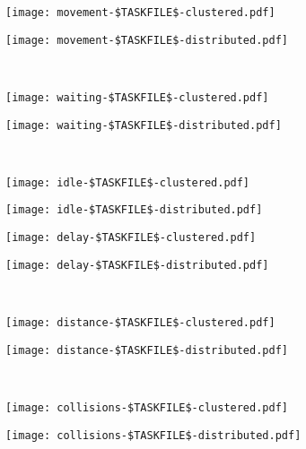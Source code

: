 \documentclass[11pt,a4paper]{article}
\begin{document}
\noindent
\begin{minipage}{0.5\textwidth}
\texttt{[image: movement-\$TASKFILE\$-clustered.pdf]}
\end{minipage}
\begin{minipage}{0.5\textwidth}
\texttt{[image: movement-\$TASKFILE\$-distributed.pdf]}
\end{minipage}
\\[0.2cm]

\noindent
\begin{minipage}{0.5\textwidth}
\texttt{[image: waiting-\$TASKFILE\$-clustered.pdf]}
\end{minipage}
\begin{minipage}{0.5\textwidth}
\texttt{[image: waiting-\$TASKFILE\$-distributed.pdf]}
\end{minipage}
\\[0.2cm]

\noindent
\begin{minipage}{0.5\textwidth}
\texttt{[image: idle-\$TASKFILE\$-clustered.pdf]}
\end{minipage}
\begin{minipage}{0.5\textwidth}
\texttt{[image: idle-\$TASKFILE\$-distributed.pdf]}
\end{minipage}

\noindent
\begin{minipage}{0.5\textwidth}
\texttt{[image: delay-\$TASKFILE\$-clustered.pdf]}
\end{minipage}
\begin{minipage}{0.5\textwidth}
\texttt{[image: delay-\$TASKFILE\$-distributed.pdf]}
\end{minipage}
\\[0.5cm]

\noindent
\begin{minipage}{0.5\textwidth}
\texttt{[image: distance-\$TASKFILE\$-clustered.pdf]}
\end{minipage}
\begin{minipage}{0.5\textwidth}
\texttt{[image: distance-\$TASKFILE\$-distributed.pdf]}
\end{minipage}
\\[0.5cm]

\noindent
\begin{minipage}{0.5\textwidth}
\texttt{[image: collisions-\$TASKFILE\$-clustered.pdf]}
\end{minipage}
\begin{minipage}{0.5\textwidth}
\texttt{[image: collisions-\$TASKFILE\$-distributed.pdf]}
\end{minipage}
\\[0.5cm]
\end{document}
